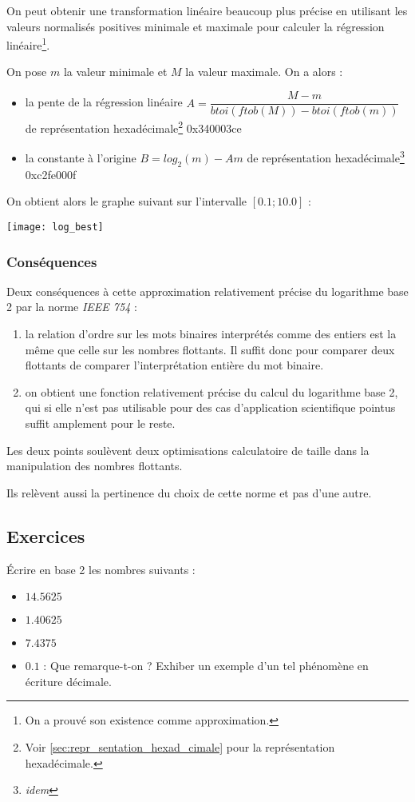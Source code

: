 \documentclass[../../main.tex]{subfiles}
\begin{document}
On peut obtenir une transformation linéaire beaucoup plus précise en utilisant les valeurs normalisés positives minimale et maximale pour calculer la régression linéaire\footnote{On a prouvé son existence comme approximation.}. 

On pose $m$ la valeur minimale et $M$ la valeur maximale. On a alors :
\begin{itemize}
  \item la pente de la régression linéaire $A = \dfrac{M - m}{btoi(ftob(M)) - btoi(ftob(m))}$ de représentation hexadécimale\footnote{Voir \ref{sec:repr_sentation_hexad_cimale} pour la représentation hexadécimale.} \textsf{0x340003ce}
  \item la constante à l'origine $B = log_2(m) - Am$ de représentation hexadécimale\footnote{\textit{idem}} \textsf{0xc2fe000f}
\end{itemize}
On obtient alors le graphe suivant sur l'intervalle $[0.1; 10.0]$ :
\begin{center}
  \texttt{[image: log\_best]}
\end{center}
\subsubsection{Conséquences} \label{ssub:cons_quences}
Deux conséquences à cette approximation relativement précise du logarithme base 2 par la norme \textit{IEEE 754} :
\begin{enumerate}
  \item la relation d'ordre sur les mots binaires interprétés comme des entiers est la même que celle sur les nombres flottants. Il suffit donc pour comparer deux flottants de comparer l'interprétation entière du mot binaire.
  \item on obtient une fonction relativement précise du calcul du logarithme base 2, qui si elle n'est pas utilisable pour des cas d'application scientifique pointus suffit amplement pour le reste.
\end{enumerate}
Les deux points soulèvent deux optimisations calculatoire de taille dans la manipulation des nombres flottants.

Ils relèvent aussi la pertinence du choix de cette norme et pas d'une autre.
\subsection{Exercices}
 Écrire en base 2 les nombres suivants :
\begin{itemize}
     \item $14.5625$
     \item $1.40625$
     \item $7.4375$
     \item $0.1$ : Que remarque-t-on ? Exhiber un exemple d'un tel phénomène en écriture décimale.
\end{itemize} 
\end{document}
